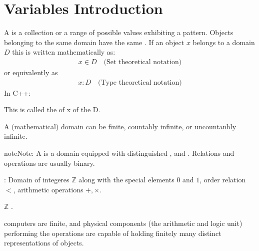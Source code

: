 \documentclass[a4paper,10pt,english]{jupyterBook}
\begin{document}
\chapter{Variables Introduction}
\label{\detokenize{text/progtut/variables:variables-introduction}}\label{\detokenize{text/progtut/variables::doc}}
\sphinxAtStartPar
A  is a collection or a range of possible values exhibiting a pattern. Objects belonging to the same domain have the same . If an object \(x\) belongs to a domain \(D\) this is written mathematically as:
\begin{equation*}
\begin{split}
x \in D \quad \text{(Set theoretical notation)}
\end{split}
\end{equation*}
\sphinxAtStartPar
or equivalently as
\begin{equation*}
\begin{split}
x : D \quad \text{(Type theoretical notation)}
\end{split}
\end{equation*}
\sphinxAtStartPar
In C++:

\begin{sphinxVerbatim}[commandchars=\\\{\}]
 
\end{sphinxVerbatim}

\sphinxAtStartPar
This is called the  of  x of the  D.

\sphinxAtStartPar
A (mathematical) domain can be finite, countably infinite, or uncountanbly infinite.

\begin{sphinxadmonition}{note}{Note:}
\sphinxAtStartPar
A  is a domain equipped with distinguished ,  and . Relations and operations are usually binary.

\sphinxAtStartPar
{}: Domain of integeres \(\mathbb{Z}\) along with the special elements \(0\) and \(1\), order relation \(<\), arithmetic operations \(+, \times\).

\sphinxAtStartPar
\(\mathbb{Z}\) .
\end{sphinxadmonition}

\sphinxAtStartPar
computers are finite, and physical components (the arithmetic and logic unit) performing the operations are capable of holding finitely many distinct representations of objects.
\end{document}
